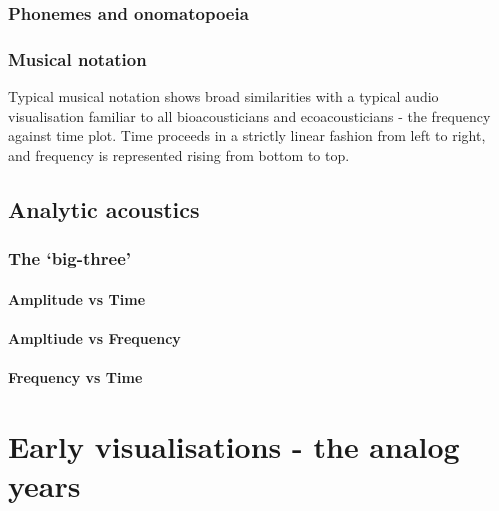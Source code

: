 \documentclass[
]{book}
\begin{document}
\hypertarget{phonemes-and-onomatopoeia}{%
\subsection{Phonemes and onomatopoeia}\label{phonemes-and-onomatopoeia}}

\hypertarget{musical-notation}{%
\subsection{Musical notation}\label{musical-notation}}

Typical musical notation shows broad similarities with a typical audio visualisation familiar to all bioacousticians and ecoacousticians - the frequency against time plot. Time proceeds in a strictly linear fashion from left to right, and frequency is represented rising from bottom to top.

\hypertarget{analytic-acoustics}{%
\section{Analytic acoustics}\label{analytic-acoustics}}

\hypertarget{the-big-three}{%
\subsection{The `big-three'}\label{the-big-three}}

\hypertarget{amplitude-vs-time}{%
\subsubsection{Amplitude vs Time}\label{amplitude-vs-time}}

\hypertarget{ampltiude-vs-frequency}{%
\subsubsection{Ampltiude vs Frequency}\label{ampltiude-vs-frequency}}

\hypertarget{frequency-vs-time}{%
\subsubsection{Frequency vs Time}\label{frequency-vs-time}}

\hypertarget{early-viz}{%
\chapter{Early visualisations - the analog years}\label{early-viz}}
\end{document}
